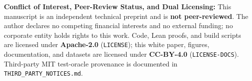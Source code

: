 \documentclass[11pt,reqno]{amsart}
\newcommand{\code}[1]{\texttt{\footnotesize #1}}
\newcommand{\us}{\_\allowbreak}
\begin{document}
\textbf{Conflict of Interest, Peer-Review Status, and Dual Licensing:} This manuscript is an independent technical preprint and is \textbf{not peer-reviewed}. The author declares no competing financial interests and no external funding; no corporate entity holds rights to this work. Code, Lean proofs, and build scripts are licensed under \textbf{Apache-2.0} (\code{LICENSE}); this white paper, figures, documentation, and datasets are licensed under \textbf{CC-BY-4.0} (\code{LICENSE-DOCS}). Third-party MIT test-oracle provenance is documented in \code{THIRD\us PARTY\us NOTICES.md}.



\end{document}

